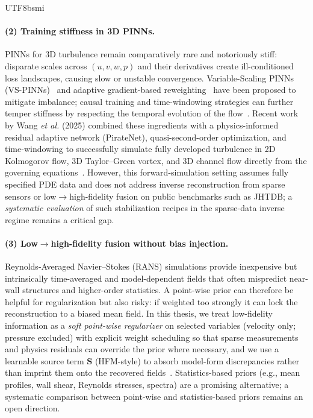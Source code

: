 \documentclass[master]{NTHUthesis}
\begin{document}
\begin{CJK*}{UTF8}{bsmi}
\paragraph{(2) Training stiffness in 3D PINNs.}
PINNs for 3D turbulence remain comparatively rare and notoriously stiff: disparate scales across $(u,v,w,p)$ and their derivatives create ill-conditioned loss landscapes, causing slow or unstable convergence. Variable-Scaling PINNs (VS-PINNs)~\cite{Ko2025JCP} and adaptive gradient-based reweighting~\cite{Wang2024, 10.1063/5.0180770} have been proposed to mitigate imbalance; causal training and time-windowing strategies can further temper stiffness by respecting the temporal evolution of the flow~\cite{WANG2024116813}. Recent work by Wang \emph{et al.} (2025) combined these ingredients with a physics-informed residual adaptive network (PirateNet), quasi-second-order optimization, and time-windowing to successfully simulate fully developed turbulence in 2D Kolmogorov flow, 3D Taylor--Green vortex, and 3D channel flow directly from the governing equations~\cite{wang2025simulatingthreedimensionalturbulencephysicsinformed}. However, this forward-simulation setting assumes fully specified PDE data and does not address inverse reconstruction from sparse sensors or low$\to$high-fidelity fusion on public benchmarks such as JHTDB; a \emph{systematic evaluation} of such stabilization recipes in the sparse-data inverse regime remains a critical gap.

\paragraph{(3) Low$\to$high-fidelity fusion without bias injection.}
Reynolds-Averaged Navier--Stokes (RANS) simulations provide inexpensive but intrinsically time-averaged and model-dependent fields that often mispredict near-wall structures and higher-order statistics. A point-wise prior can therefore be helpful for regularization but also risky: if weighted too strongly it can lock the reconstruction to a biased mean field. In this thesis, we treat low-fidelity information as a \emph{soft point-wise regularizer} on selected variables (velocity only; pressure excluded) with explicit weight scheduling so that sparse measurements and physics residuals can override the prior where necessary, and we use a learnable source term $\mathbf{S}$ (HFM-style) to absorb model-form discrepancies rather than imprint them onto the recovered fields~\cite{Raissi2020Science}. Statistics-based priors (e.g., mean profiles, wall shear, Reynolds stresses, spectra) are a promising alternative; a systematic comparison between point-wise and statistics-based priors remains an open direction.


\end{CJK*}
\end{document}
